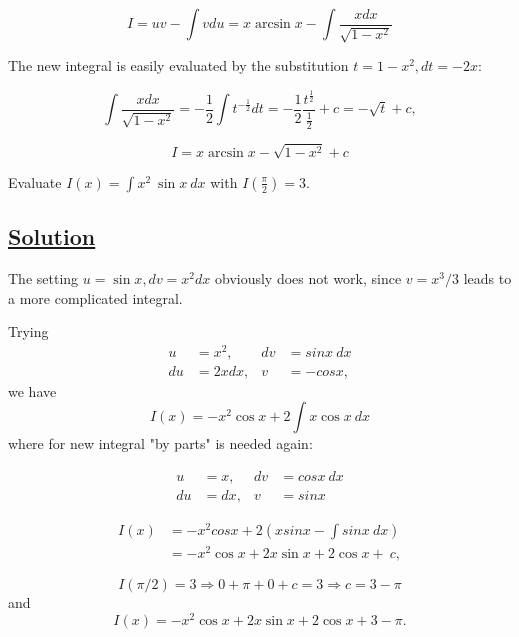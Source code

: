 \documentclass{amsbook}
\begin{document}

\begin{equation*}
    I = uv - \int v du = x \arcsin{x} - \int\frac{x dx}{\sqrt{1-x^2}}
\end{equation*}

\indent The new integral is easily evaluated by the substitution $t = 1 - x^2, dt = -2x$:

\begin{equation*}
    \int\frac{x dx}{\sqrt{1-x^2}} = -\frac{1}{2} \int t^{-\frac{1}{2}} dt = -\frac{1}{2}
    \frac{t^{\frac{1}{2}}}{{\frac{1}{2}}} + c = -\sqrt{t} + c,    
\end{equation*}

\begin{equation*}
    I = x \arcsin{x} - \sqrt{1-x^2} + c    
\end{equation*}

\begin{exmp}
     Evaluate $I(x) = \int x^2\ \sin{x}\ dx$ with $I(\frac{\pi}{2}) = 3$.
\end{exmp}

\subsection*{\underline{Solution}}
The setting $u = \sin{x}, dv = x^2 dx$ obviously does not work, since $v = x^3 / 3$ leads to a more complicated integral.

Trying
\begin{align*}
u&=x^2,           &  dv &=sinx\ dx\\
du&=2x dx,         &  v&=-cosx,
\end{align*}
we have
\begin{equation*}
    I(x) = -x^2 \cos{x} + 2 \int x \cos{x}\ dx    
\end{equation*} 
where for new integral "by parts" is needed again:

\begin{align*}
u&=x,           &  dv &=cosx\ dx\\
du&=dx,         &  v&=sinx
\end{align*}

\begin{align*}
 I(x) &= -x^2 cos{x} + 2(x sin{x} -\int sin{x}\ dx ) \\
      &= -x^2 \cos{x} + 2 x \sin{x} + 2 \cos{x} +\ c,
\end{align*}

\begin{equation*}
    I (\pi/2) = 3 \Rightarrow 0 + \pi + 0 + c  = 3 \Rightarrow c = 3 -\pi
\end{equation*}
and 
\begin{equation*}
    I(x) = -x^2 \cos{x} + 2x \sin{x} + 2 \cos{x} + 3 - \pi .
\end{equation*}
\end{document}
